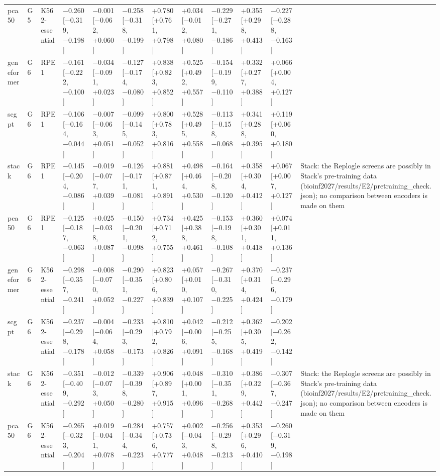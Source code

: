 \begin{tabular}{llllllllllll}
pca50 & G5 & K562-essential & −0.260 [−0.319, −0.198] & −0.001 [−0.062, +0.060] & −0.258 [−0.318, −0.199] & +0.780 [+0.761, +0.798] & +0.034 [−0.012, +0.080] & −0.229 [−0.271, −0.186] & +0.355 [+0.298, +0.413] & −0.227 [−0.288, −0.163] &  \\
geneformer & G6 & RPE1 & −0.161 [−0.222, −0.100] & −0.034 [−0.091, +0.023] & −0.127 [−0.174, −0.080] & +0.838 [+0.823, +0.852] & +0.525 [+0.492, +0.557] & −0.154 [−0.199, −0.110] & +0.332 [+0.277, +0.388] & +0.066 [+0.004, +0.127] &  \\
scgpt & G6 & RPE1 & −0.106 [−0.164, −0.044] & −0.007 [−0.063, +0.051] & −0.099 [−0.145, −0.052] & +0.800 [+0.783, +0.816] & +0.528 [+0.495, +0.558] & −0.113 [−0.158, −0.068] & +0.341 [+0.288, +0.395] & +0.119 [+0.060, +0.180] &  \\
stack & G6 & RPE1 & −0.145 [−0.204, −0.086] & −0.019 [−0.077, +0.039] & −0.126 [−0.171, −0.081] & +0.881 [+0.871, +0.891] & +0.498 [+0.464, +0.530] & −0.164 [−0.208, −0.120] & +0.358 [+0.304, +0.412] & +0.067 [+0.007, +0.127] & Stack: the Replogle screens are possibly in Stack's pre-training data (bioinf2027/results/E2/pretraining\_check.json); no comparison between encoders is made on them \\
pca50 & G6 & RPE1 & −0.125 [−0.187, −0.063] & +0.025 [−0.038, +0.087] & −0.150 [−0.201, −0.098] & +0.734 [+0.712, +0.755] & +0.425 [+0.388, +0.461] & −0.153 [−0.198, −0.108] & +0.360 [+0.301, +0.418] & +0.074 [+0.011, +0.136] &  \\
geneformer & G6 & K562-essential & −0.298 [−0.357, −0.241] & −0.008 [−0.070, +0.052] & −0.290 [−0.351, −0.227] & +0.823 [+0.806, +0.839] & +0.057 [+0.010, +0.107] & −0.267 [−0.310, −0.225] & +0.370 [+0.314, +0.424] & −0.237 [−0.296, −0.179] &  \\
scgpt & G6 & K562-essential & −0.237 [−0.298, −0.178] & −0.004 [−0.064, +0.058] & −0.233 [−0.293, −0.173] & +0.810 [+0.792, +0.826] & +0.042 [−0.006, +0.091] & −0.212 [−0.255, −0.168] & +0.362 [+0.305, +0.419] & −0.202 [−0.262, −0.142] &  \\
stack & G6 & K562-essential & −0.351 [−0.409, −0.292] & −0.012 [−0.073, +0.050] & −0.339 [−0.398, −0.280] & +0.906 [+0.897, +0.915] & +0.048 [+0.001, +0.096] & −0.310 [−0.351, −0.268] & +0.386 [+0.329, +0.442] & −0.307 [−0.367, −0.247] & Stack: the Replogle screens are possibly in Stack's pre-training data (bioinf2027/results/E2/pretraining\_check.json); no comparison between encoders is made on them \\
pca50 & G6 & K562-essential & −0.265 [−0.323, −0.204] & +0.019 [−0.041, +0.078] & −0.284 [−0.344, −0.223] & +0.757 [+0.736, +0.777] & +0.002 [−0.043, +0.048] & −0.256 [−0.298, −0.213] & +0.353 [+0.296, +0.410] & −0.260 [−0.319, −0.198] &  \\
\bottomrule
\end{tabular}
